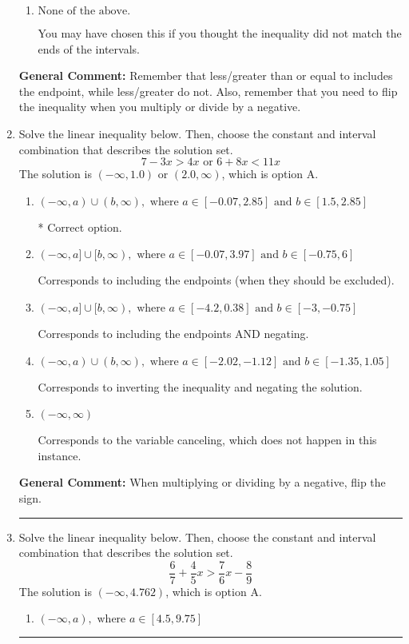 \documentclass{extbook}[14pt]
\newcommand{\litem}[1]{\item #1

\rule{\textwidth}{0.4pt}}
\begin{document}
\begin{enumerate}
{\begin{enumerate}[label=\Alph*.]
 $(-0.4, \infty)$, which corresponds to negating the endpoint of the solution.
\item \( \text{None of the above}. \)

You may have chosen this if you thought the inequality did not match the ends of the intervals.
\end{enumerate}

\textbf{General Comment:} Remember that less/greater than or equal to includes the endpoint, while less/greater do not. Also, remember that you need to flip the inequality when you multiply or divide by a negative.
}
\litem{
Solve the linear inequality below. Then, choose the constant and interval combination that describes the solution set.
\[ 7 - 3 x > 4 x \text{ or } 6 + 8 x < 11 x \]The solution is \( (-\infty, 1.0) \text{ or } (2.0, \infty) \), which is option A.\begin{enumerate}[label=\Alph*.]
\item \( (-\infty, a) \cup (b, \infty), \text{ where } a \in [-0.07, 2.85] \text{ and } b \in [1.5, 2.85] \)

 * Correct option.
\item \( (-\infty, a] \cup [b, \infty), \text{ where } a \in [-0.07, 3.97] \text{ and } b \in [-0.75, 6] \)

Corresponds to including the endpoints (when they should be excluded).
\item \( (-\infty, a] \cup [b, \infty), \text{ where } a \in [-4.2, 0.38] \text{ and } b \in [-3, -0.75] \)

Corresponds to including the endpoints AND negating.
\item \( (-\infty, a) \cup (b, \infty), \text{ where } a \in [-2.02, -1.12] \text{ and } b \in [-1.35, 1.05] \)

Corresponds to inverting the inequality and negating the solution.
\item \( (-\infty, \infty) \)

Corresponds to the variable canceling, which does not happen in this instance.
\end{enumerate}

\textbf{General Comment:} When multiplying or dividing by a negative, flip the sign.
}
\litem{
Solve the linear inequality below. Then, choose the constant and interval combination that describes the solution set.
\[ \frac{6}{7} + \frac{4}{5} x > \frac{7}{6} x - \frac{8}{9} \]The solution is \( (-\infty, 4.762) \), which is option A.\begin{enumerate}[label=\Alph*.]
\item \( (-\infty, a), \text{ where } a \in [4.5, 9.75] \)


\end{enumerate}}
\end{enumerate}
\end{document}
